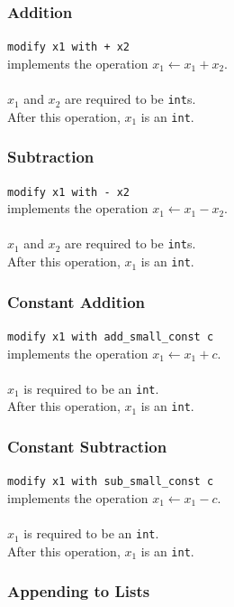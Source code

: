 \documentclass[11pt]{report}
\begin{document}
\subsubsection{Addition}

\texttt{modify x1 with + x2} \\
implements the operation $x_1 \leftarrow x_1 + x_2$. \\ \\
$x_1$ and $x_2$ are required to be \texttt{int}s. \\
After this operation, $x_1$ is an \texttt{int}.

\subsubsection{Subtraction}

\texttt{modify x1 with - x2} \\
implements the operation $x_1 \leftarrow x_1 - x_2$. \\ \\
$x_1$ and $x_2$ are required to be \texttt{int}s. \\
After this operation, $x_1$ is an \texttt{int}.

\subsubsection{Constant Addition}

\texttt{modify x1 with add\_small\_const c} \\
implements the operation $x_1 \leftarrow x_1 + c$. \\ \\
$x_1$ is required to be an \texttt{int}. \\
After this operation, $x_1$ is an \texttt{int}.

\subsubsection{Constant Subtraction}

\texttt{modify x1 with sub\_small\_const c} \\
implements the operation $x_1 \leftarrow x_1 - c$. \\ \\
$x_1$ is required to be an \texttt{int}. \\
After this operation, $x_1$ is an \texttt{int}.

\subsubsection{Appending to Lists}
\end{document}
